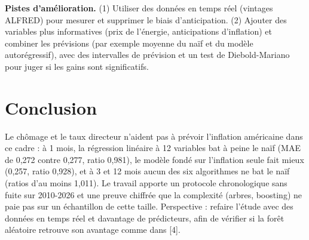 \documentclass[11pt,a4paper]{article}
\begin{document}
\textbf{Pistes d'amélioration.} (1) Utiliser des données en temps réel (vintages ALFRED) pour mesurer et supprimer le biais d'anticipation. (2) Ajouter des variables plus informatives (prix de l'énergie, anticipations d'inflation) et combiner les prévisions (par exemple moyenne du naïf et du modèle autorégressif), avec des intervalles de prévision et un test de Diebold-Mariano pour juger si les gains sont significatifs.

\section{Conclusion}
Le chômage et le taux directeur n'aident pas à prévoir l'inflation américaine dans ce cadre : à 1 mois, la régression linéaire à 12 variables bat à peine le naïf (MAE de 0,272 contre 0,277, ratio 0,981), le modèle fondé sur l'inflation seule fait mieux (0,257, ratio 0,928), et à 3 et 12 mois aucun des six algorithmes ne bat le naïf (ratios d'au moins 1,011). Le travail apporte un protocole chronologique sans fuite sur 2010-2026 et une preuve chiffrée que la complexité (arbres, boosting) ne paie pas sur un échantillon de cette taille. Perspective : refaire l'étude avec des données en temps réel et davantage de prédicteurs, afin de vérifier si la forêt aléatoire retrouve son avantage comme dans [4].

\end{document}
